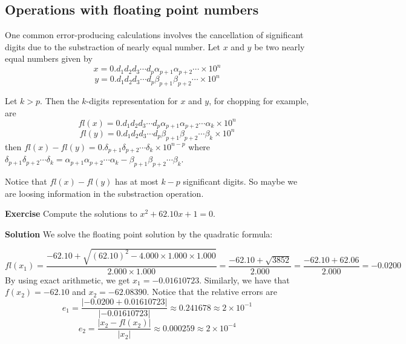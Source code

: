 \documentclass[main.tex]{subfiles}
\begin{document}
\subsection{Operations with floating point numbers}
\par One common error-producing calculations involves the cancellation of significant digits due to the substraction of nearly equal number. Let $x$ and $y$ be two nearly equal numbers given by 
\begin{equation}
    x = 0.d_1 d_2 d_3 \cdots d_p \alpha_{p+1} \alpha_{p+2} \cdots \times 10^n
\end{equation}
\begin{equation}
    y = 0.d_1 d_2 d_3 \cdots d_p \beta_{p+1} \beta_{p+2} \cdots \times 10^n
\end{equation}
\par Let $k >p$. Then the $k$-digits representation for $x$ and $y$, for chopping for example, are 
\begin{equation}
    fl(x) = 0.d_1 d_2 d_3 \cdots d_p \alpha_{p+1} \alpha_{p+2} \cdots \alpha_{k} \times 10^n
\end{equation}
\begin{equation}
    fl(y) = 0.d_1 d_2 d_3 \cdots d_p \beta_{p+1} \beta_{p+2} \cdots \beta_{k} \times 10^n
\end{equation}
then $fl(x) - fl(y)= 0.\delta_{p+1} \delta_{p+2} \cdots \delta_k \times 10^{n - p}$ where $\delta_{p+1}\delta_{p+2} \cdots \delta_k = \alpha_{p+1} \alpha_{p+2} \cdots \alpha_k - \beta_{p+1} \beta_{p+2} \cdots \beta_k$. 

\par Notice that $fl(x) - fl(y)$ has at most $k - p$ significant digits. So maybe we are loosing information in the substraction operation. 

\par \noindent \textbf{Exercise} Compute the solutions to $x^2 + 62.10 x + 1 = 0$. 

\par \noindent \textbf{Solution} We solve the floating point solution by the quadratic formula: 

\begin{equation}
    fl(x_1) = \dfrac{-62.10 + \sqrt{(62.10)^2 - 4.000\times 1.000\times 1.000}}{2.000\times 1.000} = \dfrac{-62.10 + \sqrt{3852}}{2.000} = \dfrac{-62.10 + 62.06}{2.000} = -0.0200
\end{equation}
By using exact arithmetic, we get $x_1 = -0.01610723$. Similarly, we have that $f(x_2) = -62.10$ and $x_2 = -62.08390$. Notice that the relative errors are 
\begin{equation}
    e_1 = \dfrac{|-0.0200 + 0.01610723|}{|-0.01610723|} \approx 0.241678 \approx 2 \times 10^{-1}
\end{equation}
\begin{equation}
    e_2 = \dfrac{|x_2 - fl(x_2)|}{|x_2|}\approx 0.000259 \approx 2 \times 10^{-4}
\end{equation} 
\end{document}
